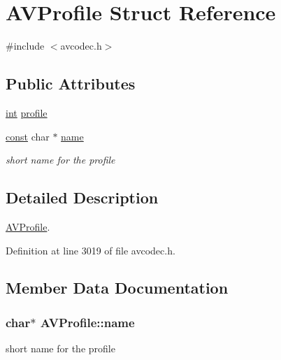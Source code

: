 \hypertarget{struct_a_v_profile}{}\section{A\+V\+Profile Struct Reference}
\label{struct_a_v_profile}


{\ttfamily \#include $<$avcodec.\+h$>$}

\subsection*{Public Attributes}
\begin{DoxyCompactItemize}
\item 
\hyperlink{xmltok_8h_a5a0d4a5641ce434f1d23533f2b2e6653}{int} \hyperlink{struct_a_v_profile_a3f7b83013dedfe74c8886eed84b65795}{profile}
\item 
\hyperlink{getopt1_8c_a2c212835823e3c54a8ab6d95c652660e}{const} char $\ast$ \hyperlink{struct_a_v_profile_aae85c56975b715b70102c71efac935fc}{name}
\begin{DoxyCompactList}\small\item\em short name for the profile \end{DoxyCompactList}\end{DoxyCompactItemize}


\subsection{Detailed Description}
\hyperlink{struct_a_v_profile}{A\+V\+Profile}. 

Definition at line 3019 of file avcodec.\+h.



\subsection{Member Data Documentation}
\subsubsection[{\texorpdfstring{name}{name}}]{ char$\ast$ A\+V\+Profile\+::name}\hypertarget{struct_a_v_profile_aae85c56975b715b70102c71efac935fc}{}\label{struct_a_v_profile_aae85c56975b715b70102c71efac935fc}


short name for the profile 



